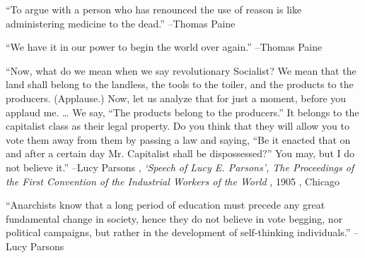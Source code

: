 \documentclass{article}%
\begin{document}
\linebreak%
\vspace{1mm}%
\begin{minipage}{\textwidth}%
\flushleft%
“To argue with a person who has renounced the use of reason is like administering medicine to the dead.”%
\linebreak%
\vspace{1mm}%
–Thomas Paine%
\linebreak%
\vspace{1mm}%
\end{minipage}%
\linebreak%
\vspace{1mm}%
\begin{minipage}{\textwidth}%
\flushleft%
“We have it in our power to begin the world over again.”%
\linebreak%
\vspace{1mm}%
–Thomas Paine%
\linebreak%
\vspace{1mm}%
\end{minipage}%
\linebreak%
\vspace{1mm}%
\begin{minipage}{\textwidth}%
\flushleft%
“Now, what do we mean when we say revolutionary Socialist? We mean that the land shall belong to the landless, the tools to the toiler, and the products to the producers. (Applause.) Now, let us analyze that for just a moment, before you applaud me. … We say, “The products belong to the producers.” It belongs to the capitalist class as their legal property. Do you think that they will allow you to vote them away from them by passing a law and saying, “Be it enacted that on and after a certain day Mr. Capitalist shall be dispossessed?” You may, but I do not believe it.”%
\linebreak%
\vspace{1mm}%
–Lucy Parsons%
, \textit{‘Speech of Lucy E. Parsons’, The Proceedings of the First Convention of the Industrial Workers of the World}%
, 1905%
, Chicago%
\linebreak%
\vspace{1mm}%
\end{minipage}%
\linebreak%
\vspace{1mm}%
\begin{minipage}{\textwidth}%
\flushleft%
“Anarchists know that a long period of education must precede any great fundamental change in society, hence they do not believe in vote begging, nor political campaigns, but rather in the development of self{-}thinking individuals.”%
\linebreak%
\vspace{1mm}%
–Lucy Parsons%
\linebreak%
\vspace{1mm}%
\end{minipage}%
\end{document}
